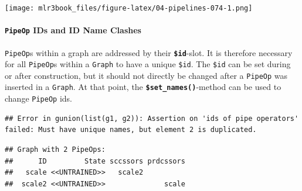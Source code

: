 \documentclass[]{article}
\newenvironment{Shaded}{\begin{snugshade}}{\end{snugshade}}
\newcommand{\KeywordTok}[1]{\textcolor[rgb]{0.13,0.29,0.53}{\textbf{#1}}}
\newcommand{\NormalTok}[1]{#1}
\newcommand{\OperatorTok}[1]{\textcolor[rgb]{0.81,0.36,0.00}{\textbf{#1}}}
\newcommand{\StringTok}[1]{\textcolor[rgb]{0.31,0.60,0.02}{#1}}
\let\oldparagraph\paragraph
\renewcommand{\paragraph}[1]{\oldparagraph{#1}\mbox{}}
\renewenvironment{Shaded} {\begin{snugshade}\small} {\end{snugshade}}
\begin{document}
\texttt{[image: mlr3book\_files/figure-latex/04-pipelines-074-1.png]}

\hypertarget{pipeop-ids-and-id-name-clashes}{%
\paragraph{\texorpdfstring{\texttt{PipeOp} IDs and ID Name Clashes}{PipeOp IDs and ID Name Clashes}}\label{pipeop-ids-and-id-name-clashes}}

\texttt{PipeOp}s within a graph are addressed by their \textbf{\texttt{\$id}}-slot.
It is therefore necessary for all \texttt{PipeOp}s within a \texttt{Graph} to have a unique \texttt{\$id}.
The \texttt{\$id} can be set during or after construction, but it should not directly be changed after a \texttt{PipeOp} was inserted in a \texttt{Graph}.
At that point, the \textbf{\texttt{\$set\_names()}}-method can be used to change \texttt{PipeOp} ids.

\begin{Shaded}
\end{Shaded}

\begin{verbatim}
## Error in gunion(list(g1, g2)): Assertion on 'ids of pipe operators' failed: Must have unique names, but element 2 is duplicated.
\end{verbatim}

\begin{Shaded}
\end{Shaded}

\begin{verbatim}
## Graph with 2 PipeOps:
##      ID         State sccssors prdcssors
##   scale <<UNTRAINED>>   scale2          
##  scale2 <<UNTRAINED>>              scale
\end{verbatim}
\end{document}
